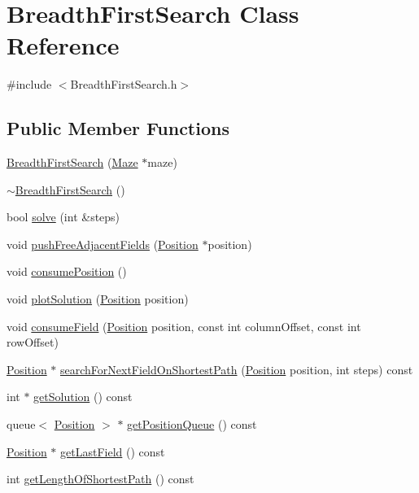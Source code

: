 \hypertarget{class_breadth_first_search}{\section{Breadth\-First\-Search Class Reference}
\label{class_breadth_first_search}
}


{\ttfamily \#include $<$Breadth\-First\-Search.\-h$>$}

\subsection*{Public Member Functions}
\begin{DoxyCompactItemize}
\item 
\hyperlink{class_breadth_first_search_aa2eb988878d47abbb9a75de86dd3ccb6}{Breadth\-First\-Search} (\hyperlink{class_maze}{Maze} $\ast$maze)
\item 
\hyperlink{class_breadth_first_search_af56e60466779aa47b1b3c10a1a84d8ca}{$\sim$\-Breadth\-First\-Search} ()
\item 
bool \hyperlink{class_breadth_first_search_a0fccce0a839583c2e80eaacc1be8ed2e}{solve} (int \&steps)
\item 
void \hyperlink{class_breadth_first_search_a466d9907ad4223398e65c56743c887fe}{push\-Free\-Adjacent\-Fields} (\hyperlink{class_position}{Position} $\ast$position)
\item 
void \hyperlink{class_breadth_first_search_a71c86843e6fd1927280edbbb8fef9c23}{consume\-Position} ()
\item 
void \hyperlink{class_breadth_first_search_aff710f432b18251df00018f9a1603f19}{plot\-Solution} (\hyperlink{class_position}{Position} position)
\item 
void \hyperlink{class_breadth_first_search_a83527ad23d6f10bea0a91fe0aad1056d}{consume\-Field} (\hyperlink{class_position}{Position} position, const int column\-Offset, const int row\-Offset)
\item 
\hyperlink{class_position}{Position} $\ast$ \hyperlink{class_breadth_first_search_a31746f6d04a82b21a8c81a320fa61023}{search\-For\-Next\-Field\-On\-Shortest\-Path} (\hyperlink{class_position}{Position} position, int steps) const 
\item 
int $\ast$ \hyperlink{class_breadth_first_search_a5e5e17159bdda443af254af3f793b80f}{get\-Solution} () const 
\item 
queue$<$ \hyperlink{class_position}{Position} $>$ $\ast$ \hyperlink{class_breadth_first_search_af5345d1f260e617dc3d1d0636341a71c}{get\-Position\-Queue} () const 
\item 
\hyperlink{class_position}{Position} $\ast$ \hyperlink{class_breadth_first_search_a72d8df8632e4b6bc86afea0793025a48}{get\-Last\-Field} () const 
\item 
int \hyperlink{class_breadth_first_search_a36963ae576749a6aa36f2075f757b925}{get\-Length\-Of\-Shortest\-Path} () const 
\end{DoxyCompactItemize}
